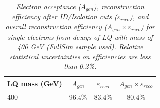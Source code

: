 %
\begin{table}[htb]
  \label{tab:ElecEffAcc}
  \begin{center}
    \begin{tabular}{|l|c|c|c|} \hline
      LQ mass (GeV) & $A_{gen}$ & $\varepsilon_{reco}$ & $A_{gen} \times \varepsilon_{reco}$\\ \hline
      400 & 96.4\% & 83.4\% & 80.4\% \\ \hline
    \end{tabular}
    \caption{\small \sl Electron acceptance ($A_{gen}$), 
      reconstruction efficiency after ID/Isolation cuts ($\varepsilon_{reco}$), and overall reconstruction efficiency 
      ($A_{gen} \times \varepsilon_{reco}$) for single electrons from decays of LQ with mass of 400 GeV (FullSim sample used).   
      Relative statistical uncertainties on efficiencies are less than 0.2\%.  
      } 
  \end{center}
\end{table}
%
